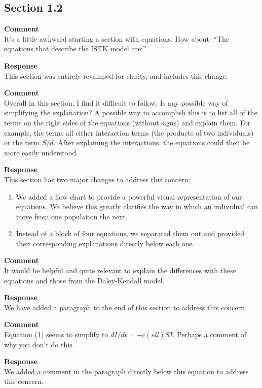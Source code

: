 \subsection{Section 1.2}
\setcounter{rev2-1.3}{1}

\textbf{Comment } \\
It’s a little awkward starting a section with equations. How about: ``The equations that describe the ISTK model are:''

\textbf{Response } \\
This section was entirely revamped for clarity, and includes this change.

\textbf{Comment } \\
Overall in this section, I find it difficult to follow.
Is any possible way of simplifying the explanation?
A possible way to accomplish this is to list all of the terms on the right sides of the equations (without signs) and explain them.
For example, the terms all either interaction terms (the products of two individuals) or the term $ S/d $.
After explaining the interactions, the equations could then be more easily understood.

\textbf{Response } \\
This section has two major changes to address this concern:
\begin{enumerate}
    \item We added a flow chart to provide a powerful visual representation of our equations.
    We believe this greatly clarifies the way in which an individual can move from one population the next.
    \item Instead of a block of four equations, we separated them out and provided their corresponding explanations directly below each one.
\end{enumerate}

\textbf{Comment } \\
It would be helpful and quite relevant to explain the differences with these equations and those from the Daley-Kendall model.

\textbf{Response } \\
We have added a paragraph to the end of this section to address this concern.

\textbf{Comment } \\
Equation (1) seems to simplify to $ dI/dt = -c(ell) S I $.
Perhaps a comment of why you don't do this.

\textbf{Response } \\
We added a comment in the paragraph directly below this equation to address this concern.
